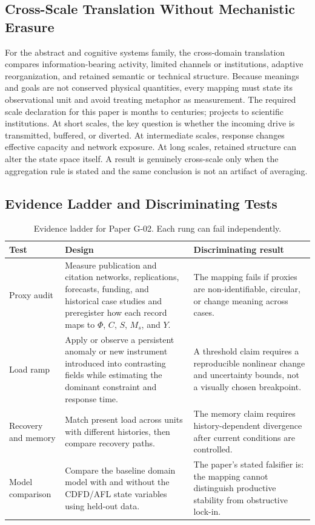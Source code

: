\documentclass[11pt,a4paper]{article}
\begin{document}
\subsection{Cross-Scale Translation Without Mechanistic Erasure}

For the abstract and cognitive systems family, the cross-domain translation compares information-bearing activity, limited channels or institutions, adaptive reorganization, and retained semantic or technical structure. Because meanings and goals are not conserved physical quantities, every mapping must state its observational unit and avoid treating metaphor as measurement. \cite{Shannon1948,BarabasiAlbert1999,WattsStrogatz1998,Turing1952,BakTangWiesenfeld1987}
The required scale declaration for this paper is months to centuries; projects to scientific institutions. At short
scales, the key question is whether the incoming drive is transmitted,
buffered, or diverted. At intermediate scales, response changes effective
capacity and network exposure. At long scales, retained structure can alter the
state space itself. A result is genuinely cross-scale only when the aggregation
rule is stated and the same conclusion is not an artifact of averaging.

\subsection{Evidence Ladder and Discriminating Tests}

\begin{table}[htbp]
\centering
\small
\caption{Evidence ladder for Paper G-02. Each rung can fail independently.}
\begin{tabularx}{\textwidth}{|p{}|X|X|}
\hline
\textbf{Test} & \textbf{Design} & \textbf{Discriminating result} \\
\hline
Proxy audit & Measure publication and citation networks, replications, forecasts, funding, and historical case studies and preregister how each record maps to $\Phi$, $C$, $S$, $M_s$, and $Y$. & The mapping fails if proxies are non-identifiable, circular, or change meaning across cases. \\
\hline
Load ramp & Apply or observe a persistent anomaly or new instrument introduced into contrasting fields while estimating the dominant constraint and response time. & A threshold claim requires a reproducible nonlinear change and uncertainty bounds, not a visually chosen breakpoint. \\
\hline
Recovery and memory & Match present load across units with different histories, then compare recovery paths. & The memory claim requires history-dependent divergence after current conditions are controlled. \\
\hline
Model comparison & Compare the baseline domain model with and without the CDFD/AFL state variables using held-out data. & The paper's stated falsifier is: the mapping cannot distinguish productive stability from obstructive lock-in. \\
\hline
\end{tabularx}
\end{table}
\end{document}
